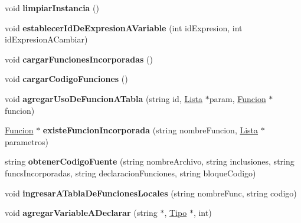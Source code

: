 \begin{DoxyCompactItemize}
\item 
\hypertarget{class_programa_a9bbd4f2853a8d172da44de51e0f8557d}{void {\bfseries limpiar\-Instancia} ()}\label{class_programa_a9bbd4f2853a8d172da44de51e0f8557d}

\item 
\hypertarget{class_programa_ab52df8aba22a447e3626d2a47ea361a2}{void {\bfseries establecer\-Id\-De\-Expresion\-A\-Variable} (int id\-Expresion, int id\-Expresion\-A\-Cambiar)}\label{class_programa_ab52df8aba22a447e3626d2a47ea361a2}

\item 
\hypertarget{class_programa_ac40b29627612d579d28fc3e0e8f1ad00}{void {\bfseries cargar\-Funciones\-Incorporadas} ()}\label{class_programa_ac40b29627612d579d28fc3e0e8f1ad00}

\item 
\hypertarget{class_programa_a5e7159c5ddb168dcaa821924aa6c443f}{void {\bfseries cargar\-Codigo\-Funciones} ()}\label{class_programa_a5e7159c5ddb168dcaa821924aa6c443f}

\item 
\hypertarget{class_programa_a9b2d1f8c44af1fd01670a051fec2ecd3}{void {\bfseries agregar\-Uso\-De\-Funcion\-A\-Tabla} (string id, \hyperlink{class_lista}{Lista} $\ast$param, \hyperlink{class_funcion}{Funcion} $\ast$funcion)}\label{class_programa_a9b2d1f8c44af1fd01670a051fec2ecd3}

\item 
\hypertarget{class_programa_acbce5ae01c494598cfe55b48d259ee9d}{\hyperlink{class_funcion}{Funcion} $\ast$ {\bfseries existe\-Funcion\-Incorporada} (string nombre\-Funcion, \hyperlink{class_lista}{Lista} $\ast$parametros)}\label{class_programa_acbce5ae01c494598cfe55b48d259ee9d}

\item 
\hypertarget{class_programa_a0ec63441ebcf7daad7b275e35cffa564}{string {\bfseries obtener\-Codigo\-Fuente} (string nombre\-Archivo, string inclusiones, string funcs\-Incorporadas, string declaracion\-Funciones, string bloque\-Codigo)}\label{class_programa_a0ec63441ebcf7daad7b275e35cffa564}

\item 
\hypertarget{class_programa_aa66c0e7152fdd0e6f3279b81b7b96a7d}{void {\bfseries ingresar\-A\-Tabla\-De\-Funciones\-Locales} (string nombre\-Func, string codigo)}\label{class_programa_aa66c0e7152fdd0e6f3279b81b7b96a7d}

\item 
\hypertarget{class_programa_abfaaed619a7638a8c9507fe292c2e669}{void {\bfseries agregar\-Variable\-A\-Declarar} (string $\ast$, \hyperlink{class_tipo}{Tipo} $\ast$, int)}\label{class_programa_abfaaed619a7638a8c9507fe292c2e669}


\end{DoxyCompactItemize}
